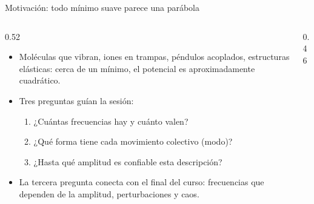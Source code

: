 \documentclass[spanish]{beamer}
\begin{document}
\begin{frame}{Motivación: todo mínimo suave parece una parábola}
\begin{columns}[T]
\begin{column}{0.52\textwidth}
\begin{itemize}
\item<1-> Moléculas que vibran, iones en trampas, péndulos acoplados, estructuras elásticas: cerca de un mínimo, el potencial es aproximadamente cuadrático.
\item<2-> Tres preguntas guían la sesión:
  \begin{enumerate}
  \item ¿Cuántas frecuencias hay y cuánto valen?
  \item ¿Qué forma tiene cada movimiento colectivo (modo)?
  \item ¿Hasta qué amplitud es confiable esta descripción?
  \end{enumerate}
\item<3-> La tercera pregunta conecta con el final del curso: frecuencias que dependen de la amplitud, perturbaciones y caos.
\end{itemize}
\end{column}
\begin{column}{0.46\textwidth}
\end{column}
\end{columns}
\end{frame}
\end{document}

